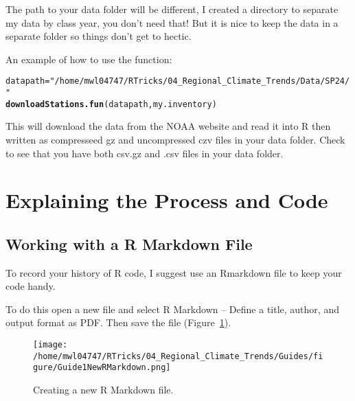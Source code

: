 \documentclass{article}\usepackage[]{graphicx}\usepackage[dvipsnames]{xcolor}
\makeatletter
\newcommand{\hlstr}[1]{\textcolor[rgb]{0.192,0.494,0.8}{#1}}%
\newcommand{\hlstd}[1]{\textcolor[rgb]{0.345,0.345,0.345}{#1}}%
\newcommand{\hlkwb}[1]{\textcolor[rgb]{0.69,0.353,0.396}{#1}}%
\newcommand{\hlkwd}[1]{\textcolor[rgb]{0.737,0.353,0.396}{\textbf{#1}}}%
\newenvironment{kframe}{%
 \def\at@end@of@kframe{}%
 \ifinner\ifhmode%
  \def\at@end@of@kframe{\end{minipage}}%
  \begin{minipage}{\columnwidth}%
 \fi\fi%
 \def\FrameCommand##1{\hskip\@totalleftmargin \hskip-\fboxsep
 \colorbox{shadecolor}{##1}\hskip-\fboxsep
     \hskip-\linewidth \hskip-\@totalleftmargin \hskip\columnwidth}%
 \MakeFramed {\advance\hsize-\width
   \@totalleftmargin\z@ \linewidth\hsize
   \@setminipage}}%
 {\par\unskip\endMakeFramed%
 \at@end@of@kframe}
\newenvironment{knitrout}{}{} %
\makeatother
\begin{document}
\begin{description}
The path to your data folder will be different, I created a directory to separate my data by class year, you don't need that! But it is nice to keep the data in a separate folder so things don't get to hectic.

An example of how to use the function: 

\begin{knitrout}
\color{fgcolor}\begin{kframe}
\begin{alltt}
\hlstd{datapath} \hlkwb{=} \hlstr{"/home/mwl04747/RTricks/04_Regional_Climate_Trends/Data/SP24/"}
\hlkwd{downloadStations.fun}\hlstd{(datapath, my.inventory)}
\end{alltt}
\end{kframe}
\end{knitrout}

This will download the data from the NOAA website and read it into R then written as compresseed gz and uncompressed czv files in your data folder. Check to see that you have both csv.gz and .csv files in your data folder.

\end{description}

\noindent {\Large\textcolor{LightRubineRed}{You're are done with this guide, go to Guide 2!}}

\section{Explaining the Process and Code}

\subsection{Working with a R Markdown File}\label{subsec:RMarkdown}

To record your history of R code, I suggest use an Rmarkdown file to keep your code handy. 

To do this open a new file and select R Markdown -- Define a title, author, and output format as PDF. Then save the file (Figure~\ref{fig:RMarkdown}). 

\begin{figure}[h]
\centering
\texttt{[image: /home/mwl04747/RTricks/04\_Regional\_Climate\_Trends/Guides/figure/Guide1NewRMarkdown.png]}
\caption{Creating a new R Markdown file.}
\label{fig:RMarkdown}
\end{figure}
\end{document}
